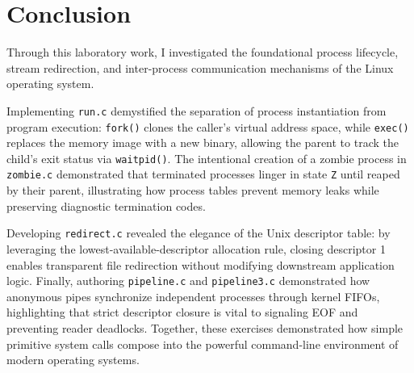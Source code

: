 \documentclass{labreport}
\begin{document}
\section{Conclusion}

Through this laboratory work, I investigated the foundational process lifecycle, stream redirection, and inter-process communication mechanisms of the Linux operating system.

Implementing \texttt{run.c} demystified the separation of process instantiation from program execution: \texttt{fork()} clones the caller's virtual address space, while \texttt{exec()} replaces the memory image with a new binary, allowing the parent to track the child's exit status via \texttt{waitpid()}. The intentional creation of a zombie process in \texttt{zombie.c} demonstrated that terminated processes linger in state \texttt{Z} until reaped by their parent, illustrating how process tables prevent memory leaks while preserving diagnostic termination codes.

Developing \texttt{redirect.c} revealed the elegance of the Unix descriptor table: by leveraging the lowest-available-descriptor allocation rule, closing descriptor 1 enables transparent file redirection without modifying downstream application logic. Finally, authoring \texttt{pipeline.c} and \texttt{pipeline3.c} demonstrated how anonymous pipes synchronize independent processes through kernel FIFOs, highlighting that strict descriptor closure is vital to signaling EOF and preventing reader deadlocks. Together, these exercises demonstrated how simple primitive system calls compose into the powerful command-line environment of modern operating systems.
\end{document}
